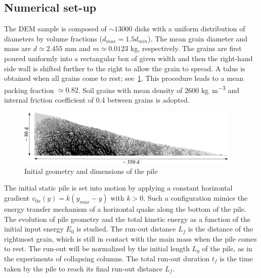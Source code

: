 \subsection{Numerical set-up}
\label{sec:num}

The DEM sample 
is composed of $\sim13000$ disks with a uniform distribution of diameters by 
volume fractions ($d_{max} = 1.5 d_{min}$). The mean grain diameter and mass 
are $d\simeq 2.455 $ \si{\mm} and $m\simeq 0.0123$ \si{\kg}, respectively. The 
grains are first poured uniformly into a rectangular box of given width and 
then the right-hand side wall is shifted further to the right to allow the 
grain to spread. A talus is obtained when all grains come to rest; 
see~\cref{fig:slope_configuration}. This procedure leads to a mean packing 
fraction $\simeq 0.82$. Soil grains with mean density of 2600 
\si{\kg\per\m\cubed} and internal friction coefficient of 0.4 between grains 
is adopted.

\begin{figure}[tbph]
\includegraphics[width=0.95\textwidth]{slope_configuration}
\caption{Initial geometry and dimensions of the pile}
\label{fig:slope_configuration}
\end{figure}


The initial static pile is set into motion by applying a constant horizontal
gradient  $v_{0x}(y) = k (y_{max} - y)$ with $k>0$. Such a configuration 
mimics the energy transfer mechanism of a horizontal quake along the bottom of 
the pile. The evolution of pile geometry and the total kinetic energy as a 
function of the initial input energy $E_0$ is studied. The run-out distance 
$L_f$ is the distance of the rightmost grain, which is still in contact with 
the main mass when the pile comes to rest.  The run-out will be normalized by 
the initial length $L_0$ of the pile, as in the experiments of collapsing 
columns. The total run-out duration $t_f$ is the time taken by the pile to 
reach its final run-out distance $L_f$.

